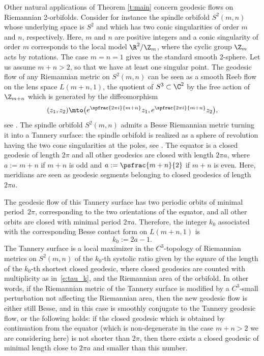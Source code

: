 \begin{exm}\label{exm:besse_spindle}
Other natural applications of Theorem \ref{t:main} concern geodesic flows on Riemannian 2-orbifolds. Consider for instance the spindle orbifold $S^2(m,n)$ whose underlying space is $S^2$ and which has two conic singularities of order $m$ and $n$, respectively. Here, $m$ and $n$ are positive integers and a conic singularity of order $m$ corresponds to the local model $\R^2/\Z_m$, where the cyclic group $\Z_m$ acts by rotations. The case $m=n=1$ gives us the standard smooth 2-sphere. Let us assume $m+n>2$, so that we have at least one singular point. The geodesic flow of any Riemannian metric on $S^2(m,n)$ can be seen as a smooth Reeb flow on the lens space $L(m+n,1)$, \ie the quotient of $S^3\subset \C^2$ by the free action of $\Z_{m+n}$ which is generated by the diffeomorphism
\[
(z_1,z_2) \mto \bigl( e^{\spfrac{2\pi i}{m+n}} z_1, e^{\spfrac{2\pi i}{m+n}} z_2 \bigr),
\]
see \cite{Lange:2020}. The spindle orbifold $S^2(m,n)$ admits a Besse Riemannian metric turning it into a Tannery surface: the spindle orbifold is realized as a sphere of revolution having the two cone singularities at the poles, see \cite[Chap.\,4]{Besse:1978pr}. The equator is a closed geodesic of length $2\pi$ and all other geodesics are closed with length $2\pi a$, where $a:= m+n$ if $m+n$ is odd and $a:= \psfrac{m+n}{2}$ if $m+n$ is even. Here, meridians are seen as geodesic segments belonging to closed geodesics of length $2\pi a$.

The geodesic flow of this Tannery surface has two periodic orbits of minimal period~$2\pi$, corresponding to the two orientations of the equator, and all other orbits are closed with minimal period $2\pi a$. Therefore, the integer $k_0$ associated with the corresponding Besse contact form on $L(m+n,1)$ is
\[
k_0 := 2a -1.
\]
The Tannery surface is a local maximizer in the $C^3$-topology of Riemannian metrics on $S^2(m,n)$ of the $k_0$-th systolic ratio given by the square of the length of the $k_0$\nobreakdash-th shortest closed geodesic, where closed geodesics are counted with multiplicity as in~\eqref{e:tau_k}, and the Riemannian area of the orbifold. In other words, if the Riemannian metric of the Tannery surface is modified by a $C^3$-small perturbation not affecting the Riemannian area, then the new geodesic flow is either still Besse, and in this case is smoothly conjugate to the Tannery geodesic flow, or the following holds: if the closed geodesic which is obtained by continuation from the equator (which is non-degenerate in the case $m+n>2$ we are considering here) is not shorter than $2\pi$, then there exists a closed geodesic of minimal length close to $2\pi a$ and smaller than this number.


\end{exm}
